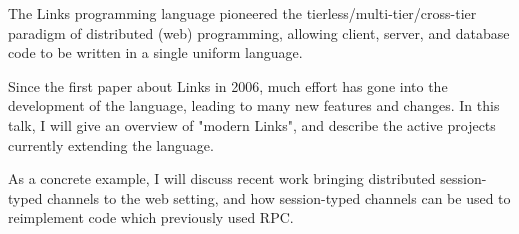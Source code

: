 The Links programming language pioneered the tierless/multi-tier/cross-tier paradigm of distributed (web) programming, allowing client, server, and database code to be written in a single uniform language.

Since the first paper about Links in 2006, much effort has gone into the development of the language, leading to many new features and changes. In this talk, I will give an overview of "modern Links", and describe the active projects currently extending the language.

As a concrete example, I will discuss recent work bringing distributed session-typed channels to the web setting, and how session-typed channels can be used to reimplement code which previously used RPC.
